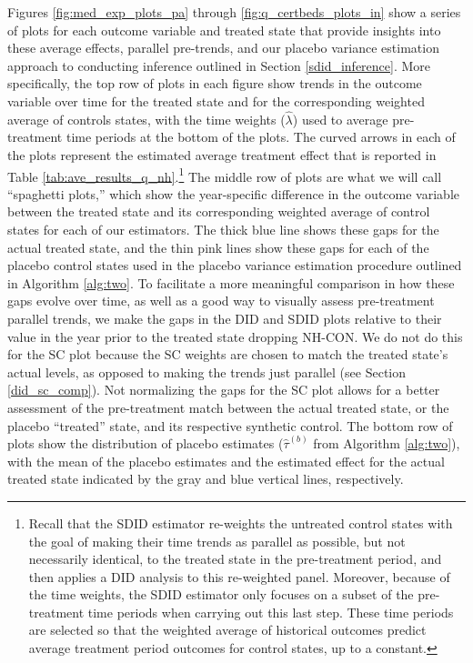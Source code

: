 \documentclass[../Main.tex]{subfiles}
\begin{document}
\indent Figures \ref{fig:med_exp_plots_pa} through \ref{fig:q_certbeds_plots_in} show a series of plots for each outcome variable and treated state that provide insights into these average effects, parallel pre-trends, and our placebo variance estimation approach to conducting inference outlined in Section \ref{sdid_inference}. More specifically, the top row of plots in each figure show trends in the outcome variable over time for the treated state and for the corresponding weighted average of controls states, with the time weights ($\hat{\lambda}$) used to average pre-treatment time periods at the bottom of the plots. The curved arrows in each of the plots represent the estimated average treatment effect that is reported in Table \ref{tab:ave_results_q_nh}.\footnote{Recall that the SDID estimator re-weights the untreated control states with the goal of making their time trends as parallel as possible, but not necessarily identical, to the treated state in the pre-treatment period, and then applies a DID analysis to this re-weighted panel. Moreover, because of the time weights, the SDID estimator only focuses on a subset of the pre-treatment time periods when carrying out this last step. These time periods are selected so that the weighted average of historical outcomes predict average treatment period outcomes for control states, up to a constant.} The middle row of plots are what we will call ``spaghetti plots,'' which show the year-specific difference in the outcome variable between the treated state and its corresponding weighted average of control states for each of our estimators. The thick blue line shows these gaps for the actual treated state, and the thin pink lines show these gaps for each of the placebo control states used in the placebo variance estimation procedure outlined in Algorithm \ref{alg:two}. To facilitate a more meaningful comparison in how these gaps evolve over time, as well as a good way to visually assess pre-treatment parallel trends, we make the gaps in the DID and SDID plots relative to their value in the year prior to the treated state dropping NH-CON. We do not do this for the SC plot because the SC weights are chosen to match the treated state's actual levels, as opposed to making the trends just parallel (see Section \ref{did_sc_comp}). Not normalizing the gaps for the SC plot allows for a better assessment of the pre-treatment match between the actual treated state, or the placebo ``treated'' state, and its respective synthetic control. The bottom row of plots show the distribution of placebo estimates ($\hat{\tau}^{(b)}$ from Algorithm \ref{alg:two}), with the mean of the placebo estimates and the estimated effect for the actual treated state indicated by the gray and blue vertical lines, respectively.
\end{document}
